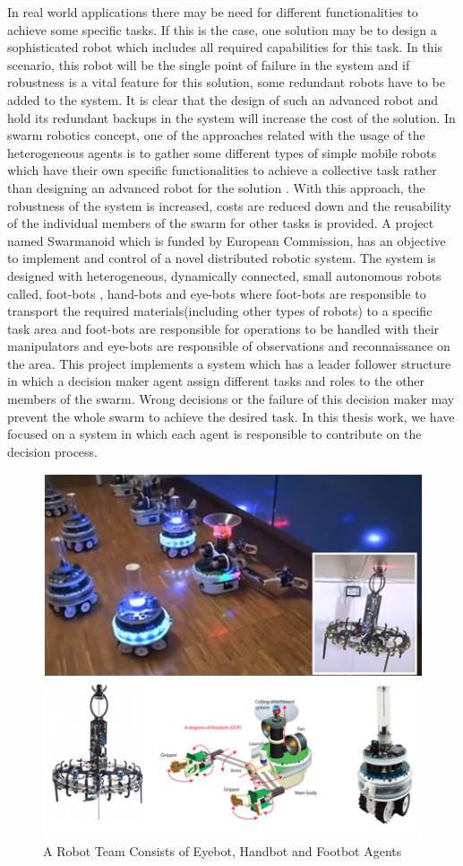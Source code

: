 In real world applications there may be need for different  functionalities to achieve some specific tasks. If this is the case, one solution may be to design a sophisticated robot which includes all required capabilities for this task. In this scenario, this robot will be the single point of failure in the system and if robustness is a  vital feature for this solution, some redundant robots have to be added to the system. It is clear that the design of such an advanced robot and hold its redundant backups in the system will increase the cost of the solution. In swarm robotics concept, one of the approaches related with the usage of the heterogeneous agents is to gather some different types of simple mobile robots which have their own specific functionalities to achieve a collective task rather than designing an advanced robot for the solution \cite{99}. With this approach, the robustness of the system is increased, costs are reduced down and the reusability of the individual members of the swarm for other tasks is provided.  A project named Swarmanoid which is funded by European Commission, has an objective to implement and control of a novel distributed robotic system. The system is designed with heterogeneous, dynamically connected, small autonomous robots called,  foot-bots , hand-bots and eye-bots where foot-bots are responsible to transport the required materials(including other types of robots) to a specific task area and foot-bots are responsible for operations to be handled with their manipulators and eye-bots are responsible of observations and reconnaissance on the area. This project implements a system which has a leader follower structure in which a decision maker agent assign different tasks and roles to the other members of the swarm. Wrong decisions or the failure of this decision maker may prevent the whole swarm to achieve the desired task. In this thesis work, we have focused on a system in which each agent is responsible to contribute on the decision process.

\begin{figure}[H]
\caption{A Robot Team Consists of Eyebot, Handbot and Footbot Agents \cite{99}}
\centering
\includegraphics[scale = 1]{eyebot}
\end{figure} 

